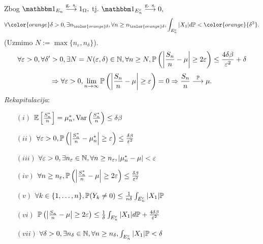 \documentclass{article}
\newcommand{\Var}{\operatorname{Var}}
\begin{document}
Zbog \(\mathbbm 1_{E_n}\overset{\text{g. s.}}{\longrightarrow}1_\Omega,\) tj. \(\mathbbm 1_{E_n^c}\overset{\text{g. s.}}{\longrightarrow}0,\) \[\forall{\color{orange}\delta>0},\exists n_{\color{orange}\delta},\forall n\ge n_{\color{orange}\delta},\int_{E_n^c}|X_1|d\Bbb P<{\color{orange}{\delta^2}}.\] 
(Uzmimo \(N:=\max\{n_\varepsilon,n_\delta\}\)).\newline \[\forall\varepsilon>0,\forall\delta'>0,\exists N=N(\varepsilon,\delta)\in\Bbb N,\forall n\ge N,\Bbb P\left(\left|\frac{S_n}n-\mu\right|\ge2\varepsilon\right)\le\frac{4\delta\beta}{\varepsilon^2}+\delta\] \[\Rightarrow\forall \varepsilon>0,\lim_{n\to\infty}\Bbb P\left(\left|\frac{S_n}n-\mu\right|\ge\varepsilon\right)=0\Rightarrow\frac{S_n}n\overset{\Bbb P}{\longrightarrow}\mu.\]
\textit{Rekapitulacija}:
\begin{enumerate}
    \item[\((i)\)] \(\Bbb E\left[\frac{S_n^*}n\right]=\mu_n^*,\Var\left(\frac{S_n^*}n\right)\le\delta\beta\)
    \item[\((ii)\)] \(\forall\varepsilon>0,\Bbb P\left(\left|\frac{S_n^*}n-\mu_n^*\right|\ge\varepsilon\right)\le\frac{\delta\beta}{\varepsilon^2}\)
    \item[\((iii)\)] \(\forall\varepsilon>0,\exists n_\varepsilon\in\Bbb N,\forall n\ge n_\varepsilon,|\mu_n^*-\mu|<\varepsilon\)
    \item[\((iv)\)] \(\forall n\ge n_\varepsilon,\Bbb P\left(\left|\frac{S_n^*}n-\mu\right|\ge2\varepsilon\right)\le\frac{\delta\beta}{\varepsilon^2}\)
    \item[\((v)\)] \(\forall k\in\{1,\ldots,n\},\Bbb P(Y_k\ne0)\le\frac1{n\delta}\int_{E_n^c}|X_1|\Bbb P\)
    \item[\((vi)\)] \(\Bbb P\left(\left|\frac{S_n}n-\mu\right|\ge2\varepsilon\right)\le\frac1\delta\int_{E_n^c}|X_1|d\Bbb P+\frac{4\delta\beta}{\varepsilon^2}\)
    \item[\((vii)\)] \(\forall\delta>0,\exists n_\delta\in\Bbb N,\forall n\ge n_\delta,\int_{E_n^c}|X_1|\Bbb P<\delta\)
\end{enumerate}\newpage
\end{document}
